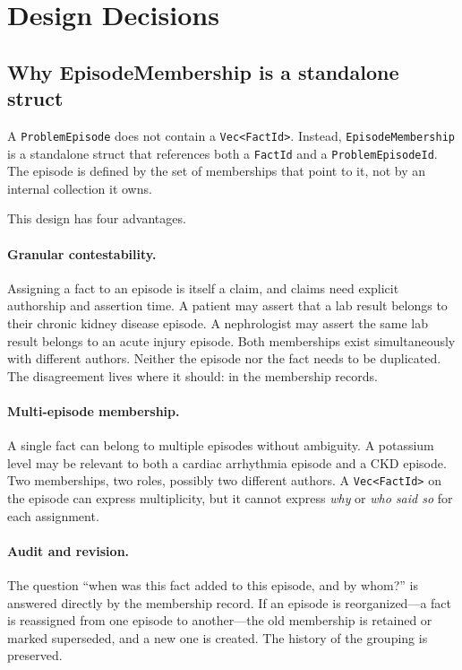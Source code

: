 \documentclass[11pt]{article}
\begin{document}
\section{Design Decisions}
\label{sec:design-decisions}

\subsection{Why EpisodeMembership is a standalone struct}
\label{sec:membership-rationale}

A \texttt{ProblemEpisode} does not contain a \texttt{Vec<FactId>}. Instead,
\texttt{EpisodeMembership} is a standalone struct that references both a
\texttt{FactId} and a \texttt{ProblemEpisodeId}. The episode is defined by the
set of memberships that point to it, not by an internal collection it owns.

This design has four advantages.

\paragraph{Granular contestability.}
Assigning a fact to an episode is itself a claim, and claims need explicit
authorship and assertion time.
A patient may assert that a lab result belongs to their chronic kidney disease
episode. A nephrologist may assert the same lab result belongs to an acute
injury episode. Both memberships exist simultaneously with different authors.
Neither the episode nor the fact needs to be duplicated. The disagreement
lives where it should: in the membership records.

\paragraph{Multi-episode membership.}
A single fact can belong to multiple episodes without ambiguity. A potassium
level may be relevant to both a cardiac arrhythmia episode and a CKD episode.
Two memberships, two roles, possibly two different authors. A
\texttt{Vec<FactId>} on the episode can express multiplicity, but it cannot
express \emph{why} or \emph{who said so} for each assignment.

\paragraph{Audit and revision.}
The question ``when was this fact added to this episode, and by whom?'' is
answered directly by the membership record. If an episode is reorganized---a
fact is reassigned from one episode to another---the old membership is
retained or marked superseded, and a new one is created. The history of the
grouping is preserved.
\end{document}
